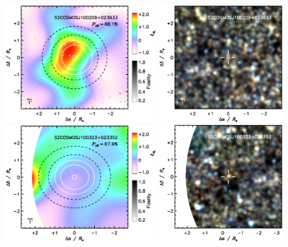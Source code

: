 \documentclass[a4paper, fleqn, usenatbib]{mnras}
\begin{document}
\begin{figure}
    \centering
    \includegraphics[width=0.5\textwidth]{S2COSMOSJ100209+023633-overdensity}
    \includegraphics[width=0.41\textwidth]{S2COSMOSJ100209+023633-spire-rgb}\\\vspace{1em}
    \includegraphics[width=0.5\textwidth]{S2COSMOSJ100323+023352-overdensity}
    \includegraphics[width=0.41\textwidth]{S2COSMOSJ100323+023352-spire-rgb}\\\vspace{1em}

\end{figure}
\end{document}
